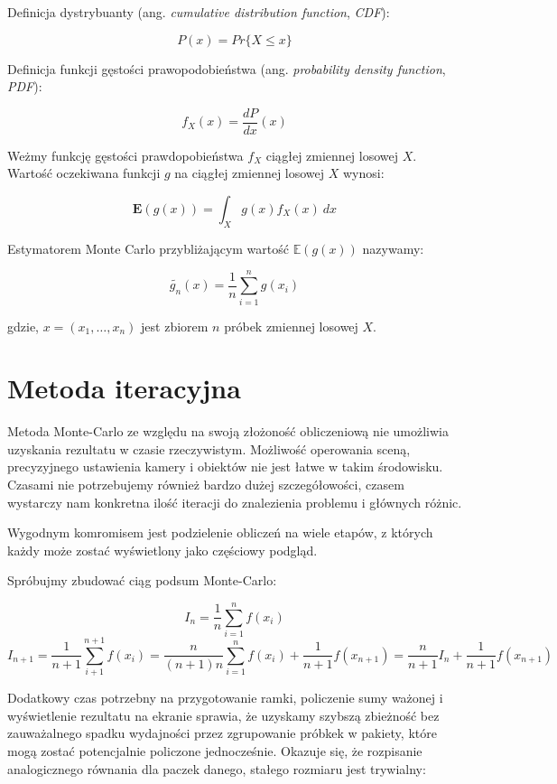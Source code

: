 \documentclass[../main.tex]{subfiles}
\begin{document}

Definicja dystrybuanty (ang. \textit{cumulative distribution function},
\textit{CDF}):

$$
P(x) = Pr \{ X \leq x \}
$$

Definicja funkcji gęstości prawopodobieństwa (ang. \textit{probability density
function}, \textit{PDF}):

$$
f_{X}(x) = \frac{dP}{dx}(x)
$$

Weżmy funkcję gęstości prawdopobieństwa $f_X$ ciągłej zmiennej losowej $X$.
Wartość oczekiwana funkcji $g$ na ciągłej zmiennej losowej $X$ wynosi:

$$
\mathbf{E}(g(x)) =
\int_{X}{
    g(x) f_{X}(x)
    \:dx
}
$$

Estymatorem Monte Carlo przybliżającym wartość $\mathbb{E}(g(x))$ nazywamy:

$$
\widetilde{g_n}(x) =
    \frac{1}{n}
    \sum_{i=1}^{n}g(x_i)
$$

gdzie, $x=(x_1, \ldots, x_n)$ jest zbiorem $n$ próbek zmiennej losowej $X$.

\section{Metoda iteracyjna}

Metoda Monte-Carlo ze względu na swoją złożoność obliczeniową nie umożliwia
uzyskania rezultatu w czasie rzeczywistym. Możliwość operowania sceną,
precyzyjnego ustawienia kamery i obiektów nie jest łatwe w takim środowisku.
Czasami nie potrzebujemy również bardzo dużej szczegółowości, czasem wystarczy
nam konkretna ilość iteracji do znalezienia problemu i głównych różnic.

Wygodnym komromisem jest podzielenie obliczeń na wiele etapów, z których każdy
może zostać wyświetlony jako częściowy podgląd.

Spróbujmy zbudować ciąg podsum Monte-Carlo:

$$
I_n = \frac{1}{n} \sum_{i=1}^{n} f(x_i)
$$
$$
I_{n+1} = \frac{1}{n+1} \sum_{i+1}^{n+1}f(x_i)
= \frac{n}{(n+1)n} \sum_{i=1}^{n}f(x_i) + \frac{1}{n+1}f(x_{n+1})
= \frac{n}{n+1} I_{n} + \frac{1}{n+1}f(x_{n+1})
$$

Dodatkowy czas potrzebny na przygotowanie ramki, policzenie sumy ważonej
i wyświetlenie rezultatu na ekranie sprawia, że uzyskamy szybszą zbieżność bez
zauważalnego spadku wydajności przez zgrupowanie próbkek w pakiety, które mogą
zostać potencjalnie policzone jednocześnie. Okazuje się, że rozpisanie
analogicznego równania dla paczek danego, stałego rozmiaru jest trywialny:
\end{document}
